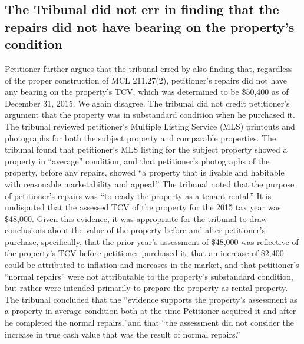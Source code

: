 \documentclass[12pt,\documentclassflag]{michiganCourtOfAppealsBrief}
\begin{document}
\subsection{The Tribunal did not err in finding that the repairs did not have bearing on the property's condition}

Petitioner further argues that the tribunal erred by also finding that, regardless of the proper
construction of MCL 211.27(2), petitioner's repairs did not have any bearing on the property's
TCV, which was determined to be \$50,400 as of December 31, 2015. We again disagree. The
tribunal did not credit petitioner's argument that the property was in substandard condition when
he purchased it. The tribunal reviewed petitioner's Multiple Listing Service (MLS) printouts and
photographs for both the subject property and comparable properties. The tribunal found that
petitioner's MLS listing for the subject property showed a property in ``average'' condition, and
that petitioner's photographs of the property, before any repairs, showed ``a property that is livable
and habitable with reasonable marketability and appeal.'' The tribunal noted that the purpose of
petitioner's repairs was ``to ready the property as a tenant rental.'' It is undisputed that the assessed
TCV of the property for the 2015 tax year was \$48,000. Given this evidence, it was appropriate
for the tribunal to draw conclusions about the value of the property before and after petitioner's
purchase, specifically, that the prior year's assessment of \$48,000 was reflective of the property's
TCV before petitioner purchased it, that an increase of \$2,400 could be attributed to inflation and 
increases in the market, and that petitioner's ``normal repairs'' were not attributable to the
property's substandard condition, but rather were intended primarily to prepare the property as
rental property. The tribunal concluded that the ``evidence supports the property's assessment as
a property in average condition both at the time Petitioner acquired it and after he completed the
normal repairs,''and that ``the assessment did not consider the increase in true cash value that was
the result of normal repairs.''
\end{document}
